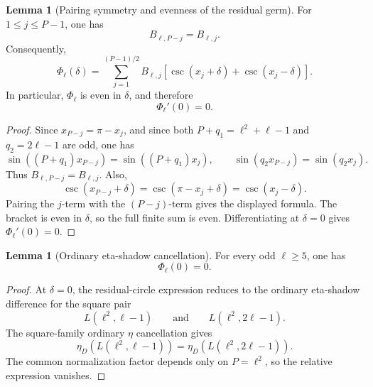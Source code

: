 \documentclass{article}
\theoremstyle{definition}
\newtheorem{lemma}[theorem]{Lemma}
\numberwithin{equation}{section}
\begin{document}
\begin{lemma}[Pairing symmetry and evenness of the residual germ]
\label{lem:residual-germ-even}
\label{lem:square-family-pairing-symmetry}
For $1\leq j\leq P-1$, one has
\begin{equation}
B_{\ell,P-j}=B_{\ell,j}.
\end{equation}
Consequently,
\begin{equation}
\Phi_\ell(\delta)=\sum_{j=1}^{(P-1)/2}B_{\ell,j}\left[\csc(x_j+\delta)+\csc(x_j-\delta)\right].
\end{equation}
In particular, $\Phi_\ell$ is even in $\delta$, and therefore
\begin{equation}
\Phi_\ell'(0)=0.
\end{equation}
\end{lemma}

\begin{proof}
Since $x_{P-j}=\pi-x_j$, and since both $P+q_1=\ell^2+\ell-1$ and $q_2=2\ell-1$ are odd, one has
\begin{equation}
\sin((P+q_1)x_{P-j})=\sin((P+q_1)x_j),
\qquad
\sin(q_2x_{P-j})=\sin(q_2x_j).
\end{equation}
Thus $B_{\ell,P-j}=B_{\ell,j}$.  Also,
\begin{equation}
\csc(x_{P-j}+\delta)=\csc(\pi-x_j+\delta)=\csc(x_j-\delta).
\end{equation}
Pairing the $j$-term with the $(P-j)$-term gives the displayed formula.  The bracket is even in $\delta$, so the full finite sum is even.  Differentiating at $\delta=0$ gives $\Phi_\ell'(0)=0$.
\end{proof}

\begin{lemma}[Ordinary eta-shadow cancellation]
\label{lem:square-family-ordinary-shadow}
For every odd $\ell\geq 5$, one has
\begin{equation}
\Phi_\ell(0)=0.
\end{equation}
\end{lemma}

\begin{proof}
At $\delta=0$, the residual-circle expression reduces to the ordinary eta-shadow difference for the square pair
\begin{equation}
L(\ell^2,\ell-1)
\qquad\text{and}\qquad
L(\ell^2,2\ell-1).
\end{equation}
The square-family ordinary $\eta$ cancellation gives
\begin{equation}
\eta_D(L(\ell^2,\ell-1))=\eta_D(L(\ell^2,2\ell-1)).
\end{equation}
The common normalization factor depends only on $P=\ell^2$, so the relative expression vanishes.
\end{proof}
\end{document}
